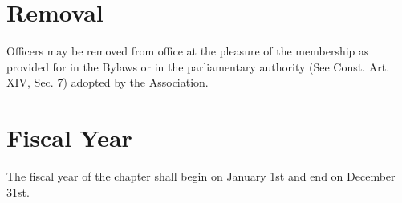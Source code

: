 \section{Removal} Officers may be removed from office at the pleasure of the membership as provided for in the Bylaws or in the parliamentary authority (See Const. Art. XIV, Sec. 7) adopted by the Association. %

\section{Fiscal Year} The fiscal year of the chapter shall begin on January 1st and end on December 31st.



